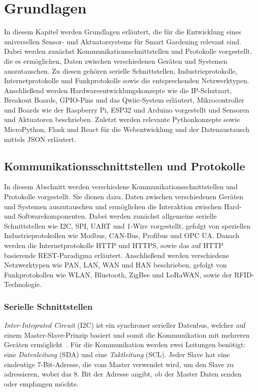 \chapter{Grundlagen}\label{ch:grundlagen}
In diesem Kapitel werden Grundlagen erläutert, die für die Entwicklung eines universellen Sensor- und Aktuatorsystems für Smart Gardening relevant sind.
Dabei werden zunächst Kommunikationsschnittstellen und Protokolle vorgestellt, die es ermöglichen, Daten zwischen verschiedenen Geräten und Systemen auszutauschen.
Zu diesen gehören serielle Schnittstellen, Industrieprotokolle, Internetprotokolle und Funkprotokolle sowie die entsprechenden Netzwerktypen.
Anschließend werden Hardwareentwicklungskonzepte wie die IP-Schutzart, Breakout Boards, GPIO-Pins und das Qwiic-System erläutert, Mikrocontroller und Boards wie der Raspberry Pi, ESP32 und Arduino vorgestellt und Sensoren und Aktuatoren beschrieben.
Zuletzt werden relevante Pythonkonzepte sowie MicroPython, Flask und React für die Webentwicklung und der Datenaustausch mittels JSON erläutert.



\section{Kommunikationsschnittstellen und Protokolle}
In diesem Abschnitt werden verschiedene Kommunikationsschnittstellen und Protokolle vorgestellt.
Sie dienen dazu, Daten zwischen verschiedenen Geräten und Systemen auszutauschen und ermöglichen die Interaktion zwischen Hard- und Softwarekomponenten.
Dabei werden zunächst allgemeine serielle Schnittstellen wie I2C, SPI, UART und 1-Wire vorgestellt, gefolgt von speziellen Industrieprotokollen wie Modbus, CAN-Bus, Profibus und OPC UA.
Danach werden die Internetprotokolle HTTP und HTTPS, sowie das auf HTTP basierende REST-Paradigma erläutert.
Anschließend werden verschiedene Netzwerktypen wie PAN, LAN, WAN und HAN beschrieben, gefolgt von Funkprotokollen wie WLAN, Bluetooth, ZigBee und LoRaWAN, sowie der RFID-Technologie.


\subsection*{Serielle Schnittstellen}
\emph{Inter-Integrated Circuit} (I2C) ist ein synchroner serieller Datenbus, welcher auf einem Master-Slave-Prinzip basiert und somit die Kommunikation mit mehreren Geräten ermöglicht~\cite{I2CReview,I2CUnderstanding}.
Für die Kommunikation werden zwei Leitungen benötigt: eine \emph{Datenleitung} (SDA) und eine \emph{Taktleitung} (SCL).
Jeder Slave hat eine eindeutige 7-Bit-Adresse, die vom Master verwendet wird, um den Slave zu adressieren, wobei das 8. Bit der Adresse angibt, ob der Master Daten senden oder empfangen möchte.

